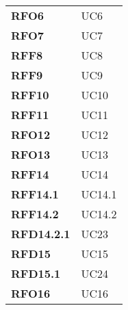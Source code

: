 \begin{longtable}[H]{>{\centering\bfseries}m{8cm} >{\centering\arraybackslash}m{8cm}}
  \textbf{RFO6} & UC6 \\
  \textbf{RFO7} & UC7 \\
  \textbf{RFF8} & UC8 \\
  \textbf{RFF9} & UC9 \\
  \textbf{RFF10} & UC10 \\
  \textbf{RFF11} & UC11 \\
  \textbf{RFO12} & UC12 \\
  \textbf{RFO13} & UC13 \\
  \textbf{RFF14} & UC14 \\
  \textbf{RFF14.1} & UC14.1 \\
  \textbf{RFF14.2} & UC14.2 \\
  \textbf{RFD14.2.1} & UC23 \\
  \textbf{RFD15} & UC15 \\
  \textbf{RFD15.1} & UC24 \\
  \textbf{RFO16} & UC16 \\

\end{longtable}
